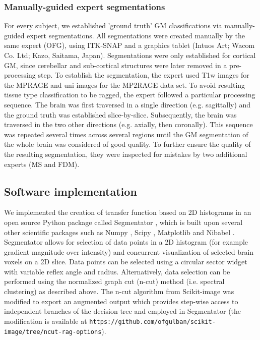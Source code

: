 \subsubsection{Manually-guided expert segmentations}
For every subject, we established 'ground truth' GM classifications via manually-guided expert segmentations. All segmentations were created manually by the same expert (OFG), using ITK-SNAP \cite{py06nimg} and a graphics tablet (Intuos Art; Wacom Co. Ltd; Kazo, Saitama, Japan). Segmentations were only established for cortical GM, since cerebellar and sub-cortical structures were later removed in a pre-processing step. To establish the segmentation, the expert used T1w images for the MPRAGE and uni images for the MP2RAGE data set. To avoid resulting tissue type classification to be ragged, the expert followed a particular processing sequence. The brain was first traversed in a single direction (e.g. sagittally) and the ground truth was established slice-by-slice. Subsequently, the brain was traversed in the two other directions (e.g. axially, then coronally). This sequence was repeated several times across several regions until the GM segmentation of the whole brain was considered of good quality. To further ensure the quality of the resulting segmentation, they were inspected for mistakes by two additional experts (MS and FDM).

\subsection{Software implementation}
We implemented the creation of transfer function based on 2D histograms in an open source Python package called Segmentator \cite{segmentator}, which is built upon several other scientific packages such as Numpy \cite{numpy2011}, Scipy \cite{scipy2001}, Matplotlib \cite{matplotlib2007} and Nibabel \cite{nibabel2017}. Segmentator allows for selection of data points in a 2D histogram (for example gradient magnitude over intensity) and concurrent visualization of selected brain voxels on a 2D slice. Data points can be selected using a circular sector widget with variable reflex angle and radius. Alternatively, data selection can be performed using the normalized graph cut (n-cut) method (i.e. spectral clustering) as described above. The n-cut algorithm from Scikit-image \cite{scikitimage2014} was modified to export an augmented output which provides step-wise access to independent branches of the decision tree and employed in Segmentator (the modification is available at \texttt{https://github.com/ofgulban/scikit-image/tree/ncut-rag-options}).

